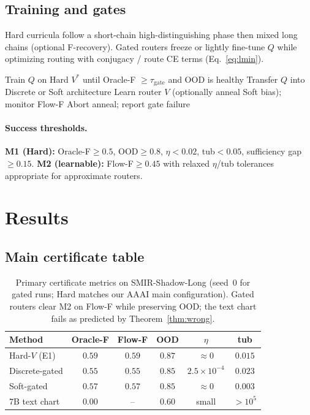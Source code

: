 \documentclass[letterpaper,10pt,twocolumn]{article}
\theoremstyle{definition}
\begin{document}
\subsection{Training and gates}
Hard curricula follow a short-chain high-distinguishing phase then mixed long chains (optional F-recovery).
Gated routers freeze or lightly fine-tune $Q$ while optimizing routing with conjugacy / route CE terms (Eq.~\ref{eq:lmin}).
\begin{algorithm}[t]
\caption{Gated learnability (Prop.~\ref{prop:gate})}
\begin{algorithmic}[1]
\State Train $Q$ on Hard $V^*$ until Oracle-F $\ge \tau_{\mathrm{gate}}$ and OOD is healthy
\State Transfer $Q$ into Discrete or Soft architecture
  \State Learn router $V$ (optionally anneal Soft bias); monitor Flow-F
\Else
  \State Abort anneal; report gate failure
\EndIf
\end{algorithmic}
\end{algorithm}

\paragraph{Success thresholds.}
\textbf{M1 (Hard):} Oracle-F$\ge 0.5$, OOD$\ge 0.8$, $\eta<0.02$, tub$<0.05$, sufficiency gap $\ge 0.15$.
\textbf{M2 (learnable):} Flow-F$\ge 0.45$ with relaxed $\eta$/tub tolerances appropriate for approximate routers.

\section{Results}
\label{sec:results}

\subsection{Main certificate table}
\begin{table}[t]
\centering
\small
\setlength{\tabcolsep}{3pt}
\begin{tabular}{lccccc}
\toprule
Method & Oracle-F & Flow-F & OOD & $\eta$ & tub \\
\midrule
Hard-$V$ (E1) & $\mathbf{0.59}$ & $0.59$ & $\mathbf{0.87}$ & $\approx 0$ & $0.015$ \\
Discrete-gated & $0.55$ & $0.55$ & $0.85$ & $2.5\!\times\!10^{-4}$ & $0.023$ \\
Soft-gated & $0.57$ & $0.57$ & $0.85$ & $\approx 0$ & $0.003$ \\
7B text chart & $0.00$ & -- & $0.60$ & small & $>10^{5}$ \\
\bottomrule
\end{tabular}
\caption{Primary certificate metrics on SMIR-Shadow-Long (seed~$0$ for gated runs; Hard matches our AAAI main configuration).
Gated routers clear M2 on Flow-F while preserving OOD; the text chart fails as predicted by Theorem~\ref{thm:wrong}.}
\label{tab:main}
\end{table}
\end{document}
